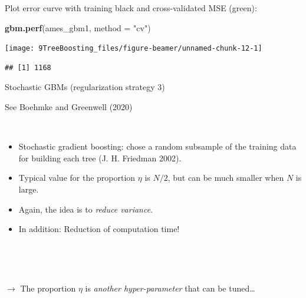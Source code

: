 \documentclass[
  10pt,
  ignorenonframetext,
]{beamer}
\newenvironment{Shaded}{\begin{snugshade}}{\end{snugshade}}
\newcommand{\AttributeTok}[1]{\textcolor[rgb]{0.13,0.29,0.53}{#1}}
\newcommand{\FunctionTok}[1]{\textcolor[rgb]{0.13,0.29,0.53}{\textbf{#1}}}
\newcommand{\NormalTok}[1]{#1}
\newcommand{\StringTok}[1]{\textcolor[rgb]{0.31,0.60,0.02}{#1}}
\providecommand{\tightlist}{%
  \setlength{\itemsep}{0pt}\setlength{\parskip}{0pt}}
\begin{document}
\begin{frame}[fragile]
Plot error curve with training black and cross-validated MSE (green):

\vspace{2mm}

\scriptsize

\begin{Shaded}
\begin{Highlighting}[]
\FunctionTok{gbm.perf}\NormalTok{(ames\_gbm1, }\AttributeTok{method =} \StringTok{"cv"}\NormalTok{)}
\end{Highlighting}
\end{Shaded}

\begin{center}\texttt{[image: 9TreeBoosting\_files/figure-beamer/unnamed-chunk-12-1]} \end{center}

\begin{verbatim}
## [1] 1168
\end{verbatim}
\end{frame}

\begin{frame}
\begin{block}{Stochastic GBMs (regularization strategy 3)}
\protect\hypertarget{stochastic-gbms-regularization-strategy-3}{}
\scriptsize

See Boehmke and Greenwell (2020)

\(~\) \normalsize

\begin{itemize}
\tightlist
\item
  Stochastic gradient boosting: chose a random subsample of the training
  data for building each tree (J. H. Friedman 2002).
\end{itemize}

\vspace{2mm}

\begin{itemize}
\tightlist
\item
  Typical value for the proportion \(\eta\) is \(N/2\), but can be much
  smaller when \(N\) is large.
\end{itemize}

\vspace{2mm}

\begin{itemize}
\tightlist
\item
  Again, the idea is to \emph{reduce variance}.
\end{itemize}

\vspace{2mm}

\begin{itemize}
\tightlist
\item
  In addition: Reduction of computation time!
\end{itemize}

\(~\)

\(~\)

\(\rightarrow\) The proportion \(\eta\) is \emph{another
hyper-parameter} that can be tuned\ldots{}
\end{block}
\end{frame}
\end{document}
